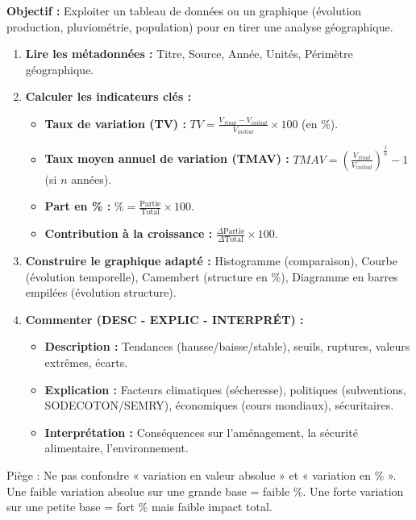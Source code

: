 \documentclass[11pt]{article}
\newcommand{\cle}[1]{{\popxbold\color{popdark}#1}}
\begin{document}
\begin{methode}
\textbf{Objectif :} Exploiter un tableau de données ou un graphique (évolution production, pluviométrie, population) pour en tirer une analyse géographique.
\begin{enumerate}
    \item \textbf{Lire les métadonnées :} Titre, Source, Année, Unités, Périmètre géographique.
    \item \textbf{Calculer les indicateurs clés :}
    \begin{itemize}
        \item \textbf{Taux de variation (TV) :} $TV = \frac{V_{final} - V_{initial}}{V_{initial}} \times 100$ (en \%).
        \item \textbf{Taux moyen annuel de variation (TMAV) :} $TMAV = \left( \frac{V_{final}}{V_{initial}} \right)^{\frac{1}{n}} - 1$ (si $n$ années).
        \item \textbf{Part en \% :} $\% = \frac{\text{Partie}}{\text{Total}} \times 100$.
        \item \textbf{Contribution à la croissance :} $\frac{\Delta \text{Partie}}{\Delta \text{Total}} \times 100$.
    \end{itemize}
    \item \textbf{Construire le graphique adapté :} Histogramme (comparaison), Courbe (évolution temporelle), Camembert (structure en \%), Diagramme en barres empilées (évolution structure).
    \item \textbf{Commenter (DESC - EXPLIC - INTERPRÉT) :}
    \begin{itemize}
        \item \textbf{Description :} Tendances (hausse/baisse/stable), seuils, ruptures, valeurs extrêmes, écarts.
        \item \textbf{Explication :} Facteurs climatiques (sécheresse), politiques (subventions, SODECOTON/SEMRY), économiques (cours mondiaux), sécuritaires.
        \item \textbf{Interprétation :} Conséquences sur l'aménagement, la sécurité alimentaire, l'environnement.
    \end{itemize}
\end{enumerate}
\cle{Piège} : Ne pas confondre « variation en valeur absolue » et « variation en \% ». Une faible variation absolue sur une grande base = faible \%. Une forte variation sur une petite base = fort \% mais faible impact total.
\end{methode}
\end{document}
